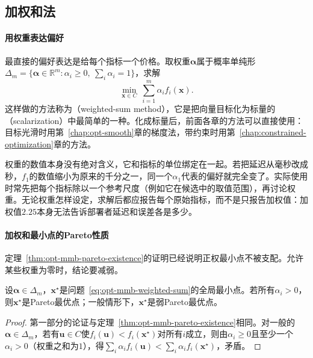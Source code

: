 \subsection{加权和法}
\label{sec:opt-mmb-weighted-sum}

\paragraph{用权重表达偏好}
最直接的偏好表达是给每个指标一个价格。取权重$\bm\alpha$属于概率单纯形$\Delta_m=\{\bm\alpha\in\mathbb R^m:\alpha_i\geq0,\ \sum_i\alpha_i=1\}$，求解
\begin{equation}
\label{eq:opt-mmb-weighted-sum}
\min_{\bm x\in C}\ \sum_{i=1}^m\alpha_if_i(\bm x).
\end{equation}
这样做的方法称为（weighted-sum method），它是把向量目标化为标量的（scalarization）中最简单的一种。化成标量后，前面各章的方法可以直接使用：目标光滑时用第~\ref{chap:opt-smooth}章的梯度法，带约束时用第~\ref{chap:constrained-optimization}章的方法。

权重的数值本身没有绝对含义，它和指标的单位绑定在一起。若把延迟从毫秒改成秒，$f_1$的数值缩小为原来的千分之一，同一个$\alpha_1$代表的偏好就完全变了。实际使用时常先把每个指标除以一个参考尺度（例如它在候选中的取值范围），再讨论权重。无论权重怎样设定，求解后都应报告每个原始指标，而不是只报告加权值：加权值$2.25$本身无法告诉部署者延迟和误差各是多少。

\paragraph{加权和最小点的Pareto性质}
定理~\ref{thm:opt-mmb-pareto-existence}的证明已经说明正权最小点不被支配。允许某些权重为零时，结论要减弱。

\begin{theorem}[加权和最小点的性质]
\label{thm:opt-mmb-weighted-sum}
设$\bm\alpha\in\Delta_m$，$\bm x^\star$是问题~\eqref{eq:opt-mmb-weighted-sum}的全局最小点。若所有$\alpha_i>0$，则$\bm x^\star$是Pareto最优点；一般情形下，$\bm x^\star$是弱Pareto最优点。
\end{theorem}

\begin{proof}
第一部分的论证与定理~\ref{thm:opt-mmb-pareto-existence}相同。对一般的$\bm\alpha\in\Delta_m$，若有$\bm u\in C$使$f_i(\bm u)<f_i(\bm x^\star)$对所有$i$成立，则由$\alpha_i\geq0$且至少一个$\alpha_i>0$（权重之和为$1$），得$\sum_i\alpha_if_i(\bm u)<\sum_i\alpha_if_i(\bm x^\star)$，矛盾。
\end{proof}

